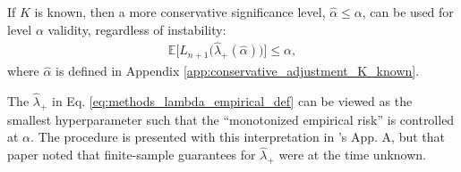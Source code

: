 \begin{remark}
    If $K$ is known, then a more conservative significance level, $\hat\alpha \leq \alpha$, can be used for level $\alpha$ validity, regardless of instability:
    \begin{align*}
        \mathbb{E}\big[L_{n+1}\big(\hat{\lambda}_{+}(\hat\alpha)\big)\big] \leq \alpha,
    \end{align*}
    where $\hat\alpha$ is defined in Appendix \ref{app:conservative_adjustment_K_known}.
\end{remark}

\begin{remark}
    The $\hat{\lambda}_+$ in Eq. \eqref{eq:methods_lambda_empirical_def} can be viewed as the smallest hyperparameter such that the ``monotonized empirical risk'' is controlled at $\alpha$. The procedure is presented with this interpretation in \citet{angelopoulos2022conformal}'s App. A, but that paper noted that finite-sample guarantees for $\hat{\lambda}_+$ were at the time unknown. 
\end{remark}

